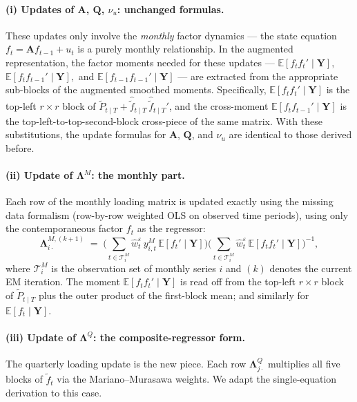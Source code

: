 \documentclass[11pt, a4paper, oneside]{article}
\newcommand{\mY}{\mathbf{Y}}
\newcommand{\mL}{\boldsymbol{\Lambda}}
\newcommand{\mA}{\mathbf{A}}
\newcommand{\mQ}{\mathbf{Q}}
\begin{document}
\paragraph{(i) Updates of $\mA$, $\mQ$, $\nu_u$: unchanged formulas.}
These updates only involve the \emph{monthly} factor dynamics — the
state equation $f_t = \mA f_{t-1} + u_t$ is a purely monthly
relationship. In the augmented representation, the factor moments
needed for these updates —
$\mathbb{E}[f_t f_t' \mid \mY],$ $\mathbb{E}[f_t f_{t-1}' \mid \mY],$ and
$\mathbb{E}[f_{t-1} f_{t-1}' \mid \mY]$ — are extracted from the
appropriate sub-blocks of the augmented smoothed moments. Specifically,
$\mathbb{E}[f_t f_t' \mid \mY]$ is the top-left $r \times r$ block of
$\tilde{P}_{t \mid T} + \hat{\tilde{f}}_{t \mid T}\,\hat{\tilde{f}}_{t \mid T}'$,
and the cross-moment $\mathbb{E}[f_t f_{t-1}' \mid \mY]$ is the
top-left-to-top-second-block cross-piece of the same matrix. With
these substitutions, the update formulas for $\mA$, $\mQ$, and
$\nu_u$ are identical to those derived before.

\paragraph{(ii) Update of $\mL^M$: the monthly part.}
Each row of the monthly loading matrix is updated exactly using the missing data formalism (row-by-row weighted OLS on observed
time periods), using only the contemporaneous factor $f_t$ as the
regressor:
\begin{equation}
\mL^{M,(k+1)}_{i \cdot} \;=\;
\Big(\sum_{t \in \mathcal{T}^M_i} \hat{w}^\varepsilon_t\, y^M_{i,t}\, \mathbb{E}[f_t' \mid \mY]\Big)
\Big(\sum_{t \in \mathcal{T}^M_i} \hat{w}^\varepsilon_t\, \mathbb{E}[f_t f_t' \mid \mY]\Big)^{-1},
\label{eq:mm-LambdaM-update}
\end{equation}
where $\mathcal{T}^M_i$ is the observation set of monthly series $i$
and $(k)$ denotes the current EM iteration. The moment
$\mathbb{E}[f_t f_t' \mid \mY]$ is read off from the top-left
$r \times r$ block of $\tilde{P}_{t \mid T}$ plus the outer product of
the first-block mean; and similarly for $\mathbb{E}[f_t \mid \mY]$.

\paragraph{(iii) Update of $\mL^Q$: the composite-regressor form.}
The quarterly loading update is the new piece. Each row
$\mL^{Q}_{j \cdot}$ multiplies all five blocks of $\tilde{f}_t$ via
the Mariano–Murasawa weights. We adapt the single-equation derivation
to this case.
\end{document}
